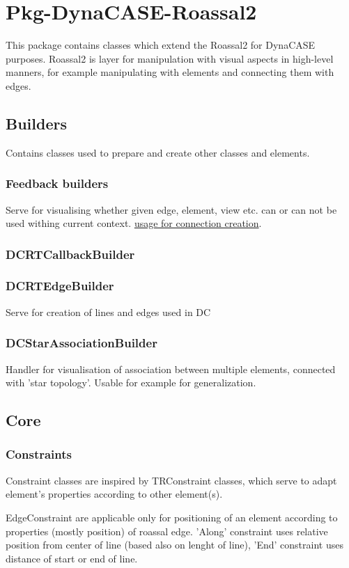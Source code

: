\documentclass[a4paper,10pt,twoside]{book}
\begin{document}
\fi
\sloppy

\chapter{ Pkg-DynaCASE-Roassal2}
This package contains classes which extend the Roassal2 for DynaCASE purposes.
Roassal2 is layer for manipulation with visual aspects in high-level manners, for example manipulating with elements and connecting them with edges.
\section{ Builders}
Contains classes used to prepare and create other classes and elements.
\subsection{ Feedback builders}
Serve for visualising whether given edge, element, view etc. can or can not be used withing current context.
\href{../figures/connection%20creation%20tool%20sequence.png}{usage for connection creation}.
\subsection{ DCRTCallbackBuilder}\subsection{ DCRTEdgeBuilder}
Serve for creation of lines and edges used in DC
\subsection{ DCStarAssociationBuilder}
Handler for visualisation of association between multiple elements, connected with 'star topology'. Usable for example for generalization.
\section{ Core}\subsection{ Constraints}
Constraint classes are inspired by TRConstraint classes, which serve to adapt element's properties according to other element(s).

EdgeConstraint are applicable only for positioning of an element according to properties (mostly position) of roassal edge.
'Along' constraint uses relative position from center of line (based also on lenght of line), 'End' constraint uses distance of start or end of line.
\end{document}

